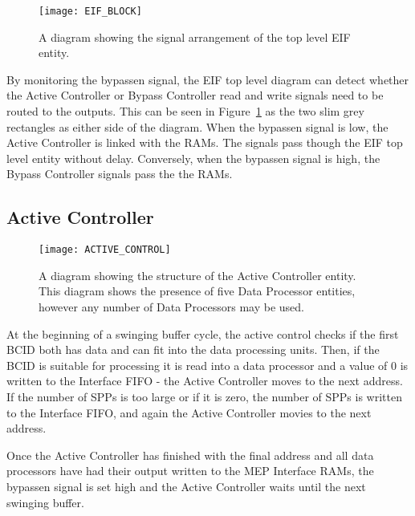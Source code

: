 		\begin{figure}[ht]
			\centering
			\texttt{[image: EIF\_BLOCK]}
			\caption{A diagram showing the signal arrangement of the top level EIF entity.}
			\label{fig:EIF_BLOCK}
		\end{figure}

		By monitoring the bypass\textunderscore en signal, the EIF top level diagram can detect whether the Active Controller or Bypass Controller read and write signals need to be routed to the outputs.
		This can be seen in Figure~\ref{fig:EIF_BLOCK} as the two slim grey rectangles as either side of the diagram.
		When the bypass\textunderscore en signal is low, the Active Controller is linked with the RAMs.
		The signals pass though the EIF top level entity without delay.
		Conversely, when the bypass\textunderscore en signal is high, the Bypass Controller signals pass the the RAMs.

		\subsection{Active Controller} %
		\label{sub:active_controller}

		\begin{figure}[ht]
			\centering
			\texttt{[image: ACTIVE\_CONTROL]}
			\caption{A diagram showing the structure of the Active Controller entity. This diagram shows the presence of five Data Processor entities, however any number of Data Processors may be used.}
			\label{fig:active_control_diagram}
		\end{figure}
		
		At the beginning of a swinging buffer cycle, the active control checks if the first BCID both has data and can fit into the data processing units.
		Then, if the BCID is suitable for processing it is read into a data processor and a value of 0 is written to the Interface FIFO - the Active Controller moves to the next address.
		If the number of SPPs is too large or if it is zero, the number of SPPs is written to the Interface FIFO, and again the Active Controller movies to the next address.

		Once the Active Controller has finished with the final address and all data processors have had their output written to the MEP Interface RAMs, the bypass\textunderscore en signal is set high and the Active Controller waits until the next swinging buffer.
		


